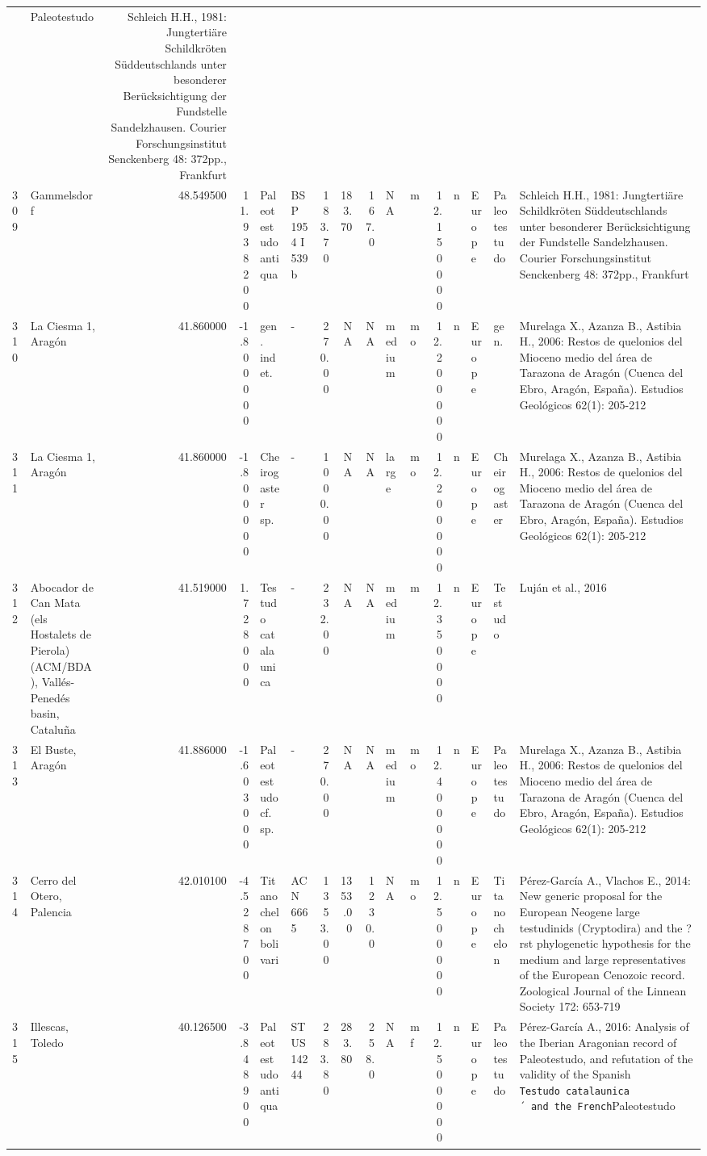 \documentclass[]{article}
\begin{document}
\begin{longtable}[]{@{}llrrllrrrllrllll@{}}
& Paleotestudo & Schleich H.H., 1981: Jungtertiäre Schildkröten
Süddeutschlands unter besonderer Berücksichtigung der Fundstelle
Sandelzhausen. Courier Forschungsinstitut Senckenberg 48: 372pp.,
Frankfurt\tabularnewline
309 & Gammelsdorf & 48.549500 & 11.938200 & Paleotestudo antiqua & BSP
1954 I 539b & 183.70 & 183.70 & 167.0 & NA & m & 12.150000 & n & Europe
& Paleotestudo & Schleich H.H., 1981: Jungtertiäre Schildkröten
Süddeutschlands unter besonderer Berücksichtigung der Fundstelle
Sandelzhausen. Courier Forschungsinstitut Senckenberg 48: 372pp.,
Frankfurt\tabularnewline
310 & La Ciesma 1, Aragón & 41.860000 & -1.800000 & gen. indet. & - &
270.00 & NA & NA & medium & mo & 12.200000 & n & Europe & gen. &
Murelaga X., Azanza B., Astibia H., 2006: Restos de quelonios del
Mioceno medio del área de Tarazona de Aragón (Cuenca del Ebro, Aragón,
España). Estudios Geológicos 62(1): 205-212\tabularnewline
311 & La Ciesma 1, Aragón & 41.860000 & -1.800000 & Cheirogaster sp. & -
& 1000.00 & NA & NA & large & mo & 12.200000 & n & Europe & Cheirogaster
& Murelaga X., Azanza B., Astibia H., 2006: Restos de quelonios del
Mioceno medio del área de Tarazona de Aragón (Cuenca del Ebro, Aragón,
España). Estudios Geológicos 62(1): 205-212\tabularnewline
312 & Abocador de Can Mata (els Hostalets de Pierola)(ACM/BDA),
Vallés-Penedés basin, Cataluña & 41.519000 & 1.728000 & Testudo
catalaunica & - & 232.00 & NA & NA & medium & m & 12.350000 & n & Europe
& Testudo & Luján et al., 2016\tabularnewline
313 & El Buste, Aragón & 41.886000 & -1.603000 & Paleotestudo cf.~sp. &
- & 270.00 & NA & NA & medium & mo & 12.400000 & n & Europe &
Paleotestudo & Murelaga X., Azanza B., Astibia H., 2006: Restos de
quelonios del Mioceno medio del área de Tarazona de Aragón (Cuenca del
Ebro, Aragón, España). Estudios Geológicos 62(1): 205-212\tabularnewline
314 & Cerro del Otero, Palencia & 42.010100 & -4.528700 & Titanochelon
bolivari & ACN 6665 & 1353.00 & 1353.00 & 1230.0 & NA & mo & 12.500000 &
n & Europe & Titanochelon & Pérez-García A., Vlachos E., 2014: New
generic proposal for the European Neogene large testudinids (Cryptodira)
and the ?rst phylogenetic hypothesis for the medium and large
representatives of the European Cenozoic record. Zoological Journal of
the Linnean Society 172: 653-719\tabularnewline
315 & Illescas, Toledo & 40.126500 & -3.848900 & Paleotestudo antiqua &
STUS 14244 & 283.80 & 283.80 & 258.0 & NA & mf & 12.500000 & n & Europe
& Paleotestudo & Pérez-García A., 2016: Analysis of the Iberian
Aragonian record of Paleotestudo, and refutation of the validity of the
Spanish \texttt{Testudo\ catalaunica´\ and\ the\ French}Paleotestudo

\end{longtable}
\end{document}
